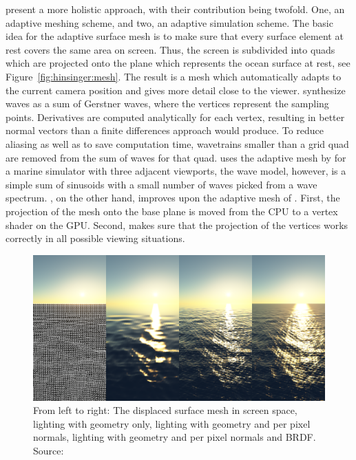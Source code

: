 \citet{Hinsinger:2002} present a more holistic approach, with their contribution
being twofold. One, an adaptive meshing scheme, and two, an adaptive simulation
scheme. The basic idea for the adaptive surface mesh is to make sure that every
surface element at rest covers the same area on screen. Thus, the screen is
subdivided into quads which are projected onto the plane which represents the
ocean surface at rest, see Figure~\ref{fig:hinsinger:mesh}. The result is
a mesh which automatically adapts to the current camera position and gives more
detail close to the viewer.
\citeauthor{Hinsinger:2002} synthesize waves as a sum of Gerstner waves, where
the vertices represent the sampling points. Derivatives are computed analytically
for each vertex, resulting in better normal vectors than a finite differences
approach would produce. To reduce aliasing as well as to save computation time,
wavetrains smaller than a grid quad are removed from the sum of waves for that quad.
\citet{Cui:2004} uses the adaptive mesh by \citeauthor{Hinsinger:2002} for a marine
simulator with three adjacent viewports, the wave model, however, is a simple sum
of sinusoids with a small number of waves picked from a wave spectrum.
\citet{thesis:johanson}, on the other hand, improves upon the adaptive mesh of
\citeauthor{Hinsinger:2002}. First, the projection of the mesh onto the base plane
is moved from the CPU to a vertex shader on the GPU. Second, \citeauthor{thesis:johanson} makes
sure that the projection of the vertices works correctly in all possible viewing
situations.
%
%
\begin{figure}[p]
 \centering
 \includegraphics[scale=0.3]{figures/Seamless_Ocean_Lighting_-_Bruneton_2010-001.png}
 \caption[Ocean surface geometry and lighting by \cite{article:oceanlighting}.]{
 From left to right: The displaced surface mesh in screen space, lighting
 with geometry only, lighting with geometry and per pixel normals, lighting with 
 geometry and per pixel normals and BRDF.
 Source:~\citet{article:oceanlighting}}
\label{fig:bruneton:transitions}
\end{figure}
